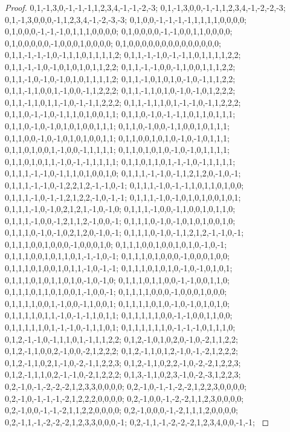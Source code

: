 \documentclass{article}
\begin{document}
\begin{proof}
{{0,1,-1,3,0,-1,-1,-1,1,2,3,4,-1,-1,-2,-3; 0,1,-1,3,0,0,-1,-1,1,2,3,4,-1,-2,-2,-3; 0,1,-1,3,0,0,0,-1,1,2,3,4,-1,-2,-3,-3; 0,1,0,0,-1,-1,-1,-1,1,1,1,1,0,0,0,0; 0,1,0,0,0,-1,-1,-1,0,1,1,1,0,0,0,0; 0,1,0,0,0,0,-1,-1,0,0,1,1,0,0,0,0; 0,1,0,0,0,0,0,-1,0,0,0,1,0,0,0,0; 0,1,0,0,0,0,0,0,0,0,0,0,0,0,0,0; 0,1,1,-1,-1,-1,0,-1,1,1,0,1,1,1,1,2; 0,1,1,-1,-1,0,-1,-1,1,0,1,1,1,1,2,2; 0,1,1,-1,-1,0,-1,0,1,0,1,0,1,1,2,2; 0,1,1,-1,-1,0,0,-1,1,0,0,1,1,1,2,2;
0,1,1,-1,0,-1,0,-1,0,1,0,1,1,1,1,2; 0,1,1,-1,0,1,0,1,0,-1,0,-1,1,1,2,2; 0,1,1,-1,1,0,0,1,-1,0,0,-1,1,2,2,2; 0,1,1,-1,1,0,1,0,-1,0,-1,0,1,2,2,2; 0,1,1,-1,1,0,1,1,-1,0,-1,-1,1,2,2,2; 0,1,1,-1,1,1,0,1,-1,-1,0,-1,1,2,2,2; 0,1,1,0,-1,-1,0,-1,1,1,0,1,0,0,1,1; 0,1,1,0,-1,0,-1,-1,1,0,1,1,0,1,1,1; 0,1,1,0,-1,0,-1,0,1,0,1,0,0,1,1,1; 0,1,1,0,-1,0,0,-1,1,0,0,1,0,1,1,1; 0,1,1,0,0,-1,0,-1,0,1,0,1,0,0,1,1; 0,1,1,0,0,1,0,1,0,-1,0,-1,0,1,1,1;
0,1,1,0,1,0,0,1,-1,0,0,-1,1,1,1,1; 0,1,1,0,1,0,1,0,-1,0,-1,0,1,1,1,1; 0,1,1,0,1,0,1,1,-1,0,-1,-1,1,1,1,1; 0,1,1,0,1,1,0,1,-1,-1,0,-1,1,1,1,1; 0,1,1,1,-1,-1,0,-1,1,1,0,1,0,0,1,0; 0,1,1,1,-1,-1,0,-1,1,2,1,2,0,-1,0,-1; 0,1,1,1,-1,-1,0,-1,2,2,1,2,-1,-1,0,-1; 0,1,1,1,-1,0,-1,-1,1,0,1,1,0,1,0,0; 0,1,1,1,-1,0,-1,-1,2,1,2,2,-1,0,-1,-1; 0,1,1,1,-1,0,-1,0,1,0,1,0,0,1,0,1; 0,1,1,1,-1,0,-1,0,2,1,2,1,-1,0,-1,0; 0,1,1,1,-1,0,0,-1,1,0,0,1,0,1,1,0;
0,1,1,1,-1,0,0,-1,2,1,1,2,-1,0,0,-1; 0,1,1,1,0,-1,0,-1,0,1,0,1,0,0,1,0; 0,1,1,1,0,-1,0,-1,0,2,1,2,0,-1,0,-1; 0,1,1,1,0,-1,0,-1,1,2,1,2,-1,-1,0,-1; 0,1,1,1,0,0,1,0,0,0,-1,0,0,0,1,0; 0,1,1,1,0,0,1,0,0,1,0,1,0,-1,0,-1; 0,1,1,1,0,0,1,0,1,1,0,1,-1,-1,0,-1; 0,1,1,1,0,1,0,0,0,-1,0,0,0,1,0,0; 0,1,1,1,0,1,0,0,1,0,1,1,-1,0,-1,-1; 0,1,1,1,0,1,0,1,0,-1,0,-1,0,1,0,1; 0,1,1,1,0,1,0,1,1,0,1,0,-1,0,-1,0; 0,1,1,1,0,1,1,0,0,-1,-1,0,0,1,1,0;
0,1,1,1,0,1,1,0,1,0,0,1,-1,0,0,-1; 0,1,1,1,1,0,0,0,-1,0,0,0,1,0,0,0; 0,1,1,1,1,0,0,1,-1,0,0,-1,1,0,0,1; 0,1,1,1,1,0,1,0,-1,0,-1,0,1,0,1,0; 0,1,1,1,1,0,1,1,-1,0,-1,-1,1,0,1,1; 0,1,1,1,1,1,0,0,-1,-1,0,0,1,1,0,0; 0,1,1,1,1,1,0,1,-1,-1,0,-1,1,1,0,1; 0,1,1,1,1,1,1,0,-1,-1,-1,0,1,1,1,0; 0,1,2,-1,-1,0,-1,1,1,0,1,-1,1,1,2,2; 0,1,2,-1,0,1,0,2,0,-1,0,-2,1,1,2,2; 0,1,2,-1,1,0,0,2,-1,0,0,-2,1,2,2,2; 0,1,2,-1,1,0,1,2,-1,0,-1,-2,1,2,2,2;
0,1,2,-1,1,0,2,1,-1,0,-2,-1,1,2,2,3; 0,1,2,-1,1,0,2,2,-1,0,-2,-2,1,2,2,3; 0,1,2,-1,1,1,0,2,-1,-1,0,-2,1,2,2,2; 0,1,3,-1,1,0,2,3,-1,0,-2,-3,1,2,2,3; 0,2,-1,0,-1,-2,-2,-2,1,2,3,3,0,0,0,0; 0,2,-1,0,-1,-1,-2,-2,1,2,2,3,0,0,0,0; 0,2,-1,0,-1,-1,-1,-2,1,2,2,2,0,0,0,0; 0,2,-1,0,0,-1,-2,-2,1,1,2,3,0,0,0,0; 0,2,-1,0,0,-1,-1,-2,1,1,2,2,0,0,0,0; 0,2,-1,0,0,0,-1,-2,1,1,1,2,0,0,0,0; 0,2,-1,1,-1,-2,-2,-2,1,2,3,3,0,0,0,-1; 0,2,-1,1,-1,-2,-2,-2,1,2,3,4,0,0,-1,-1;
}}
\end{proof}
\end{document}
